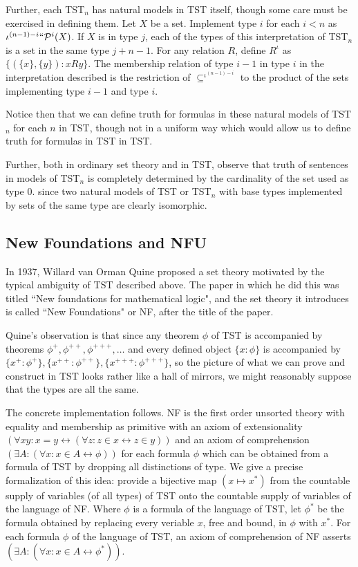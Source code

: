 \documentclass[12pt]{article}
\begin{document}
Further, each TST$_n$ has natural models in TST itself, though some care must be exercised in defining them.  Let $X$ be a set.  Implement type $i$ for each $i<n$ as
$\iota^{(n-1)-i}``{\cal P}^i(X)$.  If $X$ is in type $j$, each of the types of this interpretation of TST$_n$ is a set in the same type $j+n-1$.  For any relation $R$, define
$R^{\iota}$ as $\{(\{x\},\{y\}):x R y\}$.  The membership relation of type $i-1$ in type $i$ in the interpretation described is the restriction of $\subseteq^{\iota^{(n-1)-i}}$ to
the product of the sets implementing type $i-1$ and type $i$.

Notice then that we can define truth for formulas in these natural models of TST$_n$ for each $n$ in TST, though not in a uniform way which would allow us to define truth for formulas
in TST in TST.

Further, both in ordinary set theory and in TST, observe that truth of sentences in models of TST$_n$ is completely determined by the cardinality of the set used as type 0.
since two natural models of TST or TST$_n$ with base types implemented by sets of the same type are clearly isomorphic. 

\newpage

\subsection{New Foundations and NFU}

In 1937, Willard van Orman Quine proposed a set theory motivated by the typical ambiguity of TST described above.  The paper in which he did this was titled ``New foundations for mathematical logic", and the set theory it introduces is called ``New Foundations" or NF, after the title of the paper.

Quine's observation is that since any theorem $\phi$ of TST is accompanied by theorems $\phi^+, \phi^{++}, \phi^{+++}, \ldots$ and every defined object $\{x:\phi\}$ is accompanied by
$\{x^+:\phi^+\},\{x^{++}:\phi^{++}\},\{x^{+++}:\phi^{+++}\}$, so the picture of what we can prove and construct in TST looks rather like a hall of mirrors, we might reasonably suppose that the types are all the same.

The concrete implementation follows.  NF is the first order unsorted theory with equality and membership as primitive with an axiom of extensionality $(\forall xy:x=y \leftrightarrow (\forall z:z \in x \leftrightarrow z\in y))$ and an axiom of comprehension $(\exists A:(\forall x:x \in A \leftrightarrow \phi))$ for each formula $\phi$ which can be obtained from a formula of TST by dropping all distinctions of type.  We give a precise formalization of this idea:  provide a bijective map $(x \mapsto x^*)$ from the countable supply of variables (of all types) of TST onto the countable supply of variables of the language of NF.  Where $\phi$ is a formula of the language of TST, let $\phi^*$ be the formula obtained by replacing every veriable $x$, free and bound,
in $\phi$ with $x^*$. For each formula $\phi$ of the language of TST, an axiom of comprehension of NF asserts $(\exists A:(\forall x:x \in A \leftrightarrow \phi^*))$.
\end{document}
